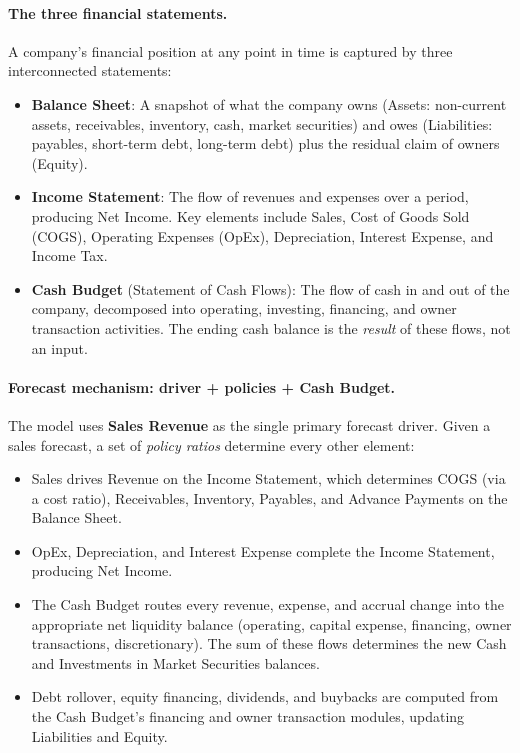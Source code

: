\documentclass[12pt,a4paper]{article}
\begin{document}
\paragraph{The three financial statements.}
A company's financial position at any point in time is captured by three
interconnected statements:

\begin{itemize}
\item \textbf{Balance Sheet}: A snapshot of what the company owns
  (Assets: non-current assets, receivables, inventory, cash, market
  securities) and owes (Liabilities: payables, short-term debt,
  long-term debt) plus the residual claim of owners (Equity).
\item \textbf{Income Statement}: The flow of revenues and expenses over
  a period, producing Net Income. Key elements include Sales, Cost of
  Goods Sold (COGS), Operating Expenses (OpEx), Depreciation, Interest
  Expense, and Income Tax.
\item \textbf{Cash Budget} (Statement of Cash Flows): The flow of cash
  in and out of the company, decomposed into operating, investing,
  financing, and owner transaction activities. The ending cash balance
  is the \emph{result} of these flows, not an input.
\end{itemize}

\paragraph{Forecast mechanism: driver + policies + Cash Budget.}
The model uses \textbf{Sales Revenue} as the single primary forecast
driver. Given a sales forecast, a set of \emph{policy ratios} determine
every other element:

\begin{itemize}
\item Sales drives Revenue on the Income Statement, which determines
  COGS (via a cost ratio), Receivables, Inventory, Payables, and
  Advance Payments on the Balance Sheet.
\item OpEx, Depreciation, and Interest Expense complete the Income
  Statement, producing Net Income.
\item The Cash Budget routes every revenue, expense, and accrual change
  into the appropriate net liquidity balance (operating, capital
  expense, financing, owner transactions, discretionary). The sum of
  these flows determines the new Cash and Investments in Market
  Securities balances.
\item Debt rollover, equity financing, dividends, and buybacks are
  computed from the Cash Budget's financing and owner transaction
  modules, updating Liabilities and Equity.
\end{itemize}
\end{document}
